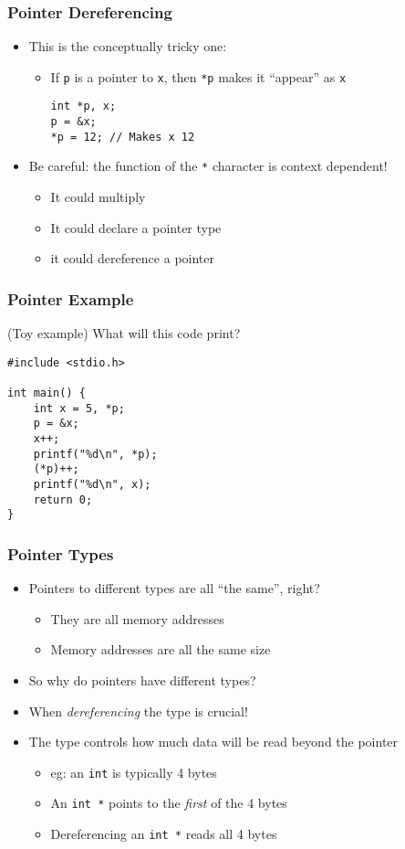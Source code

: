 \documentclass[14pt]{beamer}
\begin{document}
\begin{frame}[fragile]
\frametitle{Pointer Dereferencing}
\begin{itemize}
\item This is the conceptually tricky one:
	\begin{itemize}
		\item If \texttt{p} is a pointer to \texttt{x}, then \texttt{*p} makes it ``appear'' as \texttt{x}
		\begin{lstlisting}[style=CStyle]
int *p, x;
p = &x;
*p = 12; // Makes x 12
\end{lstlisting}
	\end{itemize}
\item Be careful: the function of the \texttt{*} character is context dependent!
	\begin{itemize}
		\item It could multiply
		\item It could declare a pointer type
		\item it could dereference a pointer
	\end{itemize}
\end{itemize}
\end{frame}

\begin{frame}[fragile]
\frametitle{Pointer Example}
(Toy example) What will this code print?
\begin{lstlisting}[style=CStyle]
#include <stdio.h>

int main() {
	int x = 5, *p;
	p = &x;
	x++;
	printf("%d\n", *p);
	(*p)++;
	printf("%d\n", x);
	return 0;
}
\end{lstlisting}
\end{frame}

\begin{frame}
\frametitle{Pointer Types}
\begin{itemize}
\item Pointers to different types are all ``the same'', right?
	\begin{itemize}
		\item They are all memory addresses
		\item Memory addresses are all the same size
	\end{itemize}
\pause
\item So why do pointers have different types?
\pause
\item When \textit{dereferencing} the type is crucial!
\item The type controls how much data will be read beyond the pointer
	\begin{itemize}
		\item eg: an \texttt{int} is typically 4 bytes
		\item An \texttt{int *} points to the \textit{first} of the 4 bytes
		\item Dereferencing an \texttt{int *} reads all 4 bytes
	\end{itemize}
\end{itemize}
\end{frame}
\end{document}
